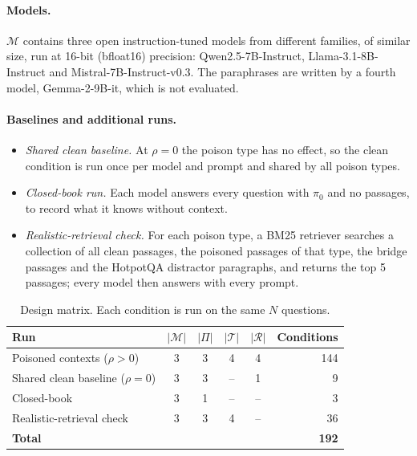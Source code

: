 \documentclass[11pt,a4paper]{report}
\begin{document}
\paragraph{Models.}
$\mathcal{M}$ contains three open instruction-tuned models from different
families, of similar size, run at 16-bit (bfloat16) precision:
Qwen2.5-7B-Instruct, Llama-3.1-8B-Instruct and Mistral-7B-Instruct-v0.3.
The paraphrases are written by a fourth model, Gemma-2-9B-it, which is not
evaluated.

\paragraph{Baselines and additional runs.}
\begin{itemize}[nosep]
  \item \emph{Shared clean baseline.} At $\rho = 0$ the poison type has no
        effect, so the clean condition is run once per model and prompt and
        shared by all poison types.
  \item \emph{Closed-book run.} Each model answers every question with
        $\pi_0$ and no passages, to record what it knows without context.
  \item \emph{Realistic-retrieval check.} For each poison type, a BM25
        retriever searches a collection of all clean passages, the
        poisoned passages of that type, the bridge passages and the
        HotpotQA distractor paragraphs, and returns the top 5 passages; every
        model then answers with every prompt.
\end{itemize}

\begin{table}[h]
\centering\small
\begin{tabular}{@{}lccccr@{}}
\toprule
Run & $|\mathcal{M}|$ & $|\Pi|$ & $|\mathcal{T}|$ & $|\mathcal{R}|$ & Conditions \\
\midrule
Poisoned contexts ($\rho > 0$) & 3 & 3 & 4 & 4 & 144 \\
Shared clean baseline ($\rho = 0$) & 3 & 3 & -- & 1 & 9 \\
Closed-book & 3 & 1 & -- & -- & 3 \\
Realistic-retrieval check & 3 & 3 & 4 & -- & 36 \\
\midrule
\textbf{Total} & & & & & \textbf{192} \\
\bottomrule
\end{tabular}
\caption{Design matrix. Each condition is run on the same $N$ questions.}
\label{tab:design}
\end{table}
\end{document}
